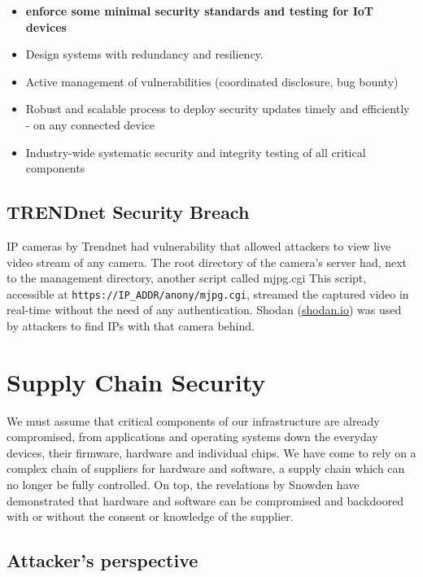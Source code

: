 \documentclass[11pt,oneside,a4paper]{article}
\begin{document}
\vspace{-\topsep}
\begin{itemize}
	\setlength{\itemsep}{0pt}
	\setlength{\parskip}{0pt}
	\item \textbf{enforce some minimal security standards and testing for IoT devices}
	\item Design systems with redundancy and resiliency.
	\item Active management of vulnerabilities (coordinated disclosure, bug bounty)
	\item Robust and scalable process to deploy security updates timely and efficiently - on any connected device
	\item Industry-wide systematic security and integrity testing of all critical components
\end{itemize}
\vspace{-\topsep}

\newpage

\subsection{TRENDnet Security Breach}

IP cameras by Trendnet had vulnerability that allowed attackers to view live video stream of any camera. The root directory of the camera’s server had, next to the management directory, another script called mjpg.cgi This script, accessible at \texttt{https://IP\_ADDR/anony/mjpg.cgi}, streamed the captured video in real-time without the need of any authentication. Shodan (\href{https://www.shodan.io/}{shodan.io}) was used by attackers to find IPs with that camera behind.

\section{Supply Chain Security}

We must assume that critical components of our infrastructure are already compromised, from applications and operating systems down the everyday devices, their firmware, hardware and individual chips. We have come to rely on a complex chain of suppliers for hardware and software, a supply chain which can no longer be fully controlled. On top, the revelations by Snowden have demonstrated that hardware and software can be compromised and backdoored with or without the consent or knowledge of the supplier.\\


\subsection{Attacker's perspective}
\end{document}
